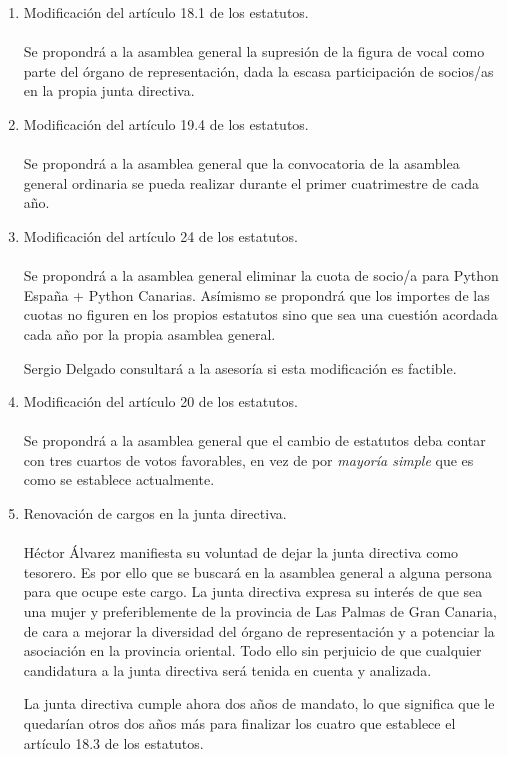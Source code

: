 \documentclass[a4paper, 12pt]{article}
\begin{document}
\begin{enumerate}
    \item Modificación del artículo 18.1 de los estatutos. \\ \\
    Se propondrá a la asamblea general la supresión de la figura de vocal como parte del órgano de representación, dada la escasa participación de socios/as en la propia junta directiva.

    \item Modificación del artículo 19.4 de los estatutos. \\ \\
    Se propondrá a la asamblea general que la convocatoria de la asamblea general ordinaria se pueda realizar durante el primer cuatrimestre de cada año.

    \item Modificación del artículo 24 de los estatutos. \\ \\
    Se propondrá a la asamblea general eliminar la cuota de socio/a para Python España + Python Canarias. Asímismo se propondrá que los importes de las cuotas no figuren en los propios estatutos sino que sea una cuestión acordada cada año por la propia asamblea general.

    Sergio Delgado consultará a la asesoría si esta modificación es factible.

    \item Modificación del artículo 20 de los estatutos. \\ \\
    Se propondrá a la asamblea general que el cambio de estatutos deba contar con tres cuartos de votos favorables, en vez de por \textit{mayoría simple} que es como se establece actualmente.

    \item Renovación de cargos en la junta directiva. \\ \\
    Héctor Álvarez manifiesta su voluntad de dejar la junta directiva como tesorero. Es por ello que se buscará en la asamblea general a alguna persona para que ocupe este cargo. La junta directiva expresa su interés de que sea una mujer y preferiblemente de la provincia de Las Palmas de Gran Canaria, de cara a mejorar la diversidad del órgano de representación y a potenciar la asociación en la provincia oriental.
    Todo ello sin perjuicio de que cualquier candidatura a la junta directiva será tenida en cuenta y analizada.

    La junta directiva cumple ahora dos años de mandato, lo que significa que le quedarían otros dos años más para finalizar los cuatro que establece el artículo 18.3 de los estatutos.


\end{enumerate}
\end{document}
